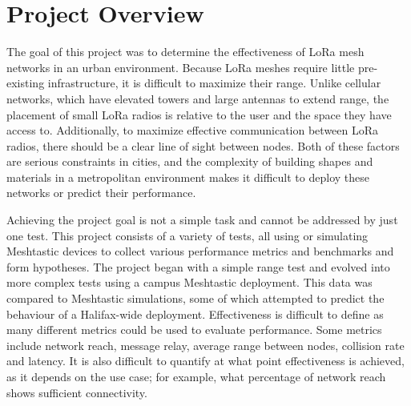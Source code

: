 \documentclass[11pt]{article}
\begin{document}
\section{Project Overview}

The goal of this project was to determine the effectiveness of LoRa mesh networks in an urban environment. Because LoRa meshes require little pre-existing infrastructure, it is difficult to maximize their range. Unlike cellular networks, which have elevated towers and large antennas to extend range, the placement of small LoRa radios is relative to the user and the space they have access to. Additionally, to maximize effective communication between LoRa radios, there should be a clear line of sight between nodes. Both of these factors are serious constraints in cities, and the complexity of building shapes and materials in a metropolitan environment makes it difficult to deploy these networks or predict their performance. 

Achieving the project goal is not a simple task and cannot be addressed by just one test. This project consists of a variety of tests, all using or simulating Meshtastic devices to collect various performance metrics and benchmarks and form hypotheses. The project began with a simple range test and evolved into more complex tests using a campus Meshtastic deployment. This data was compared to Meshtastic simulations, some of which attempted to predict the behaviour of a Halifax-wide deployment. Effectiveness is difficult to define as many different metrics could be used to evaluate performance. Some metrics include network reach, message relay, average range between nodes, collision rate and latency. It is also difficult to quantify at what point effectiveness is achieved, as it depends on the use case; for example, what percentage of network reach shows sufficient connectivity.
\end{document}
